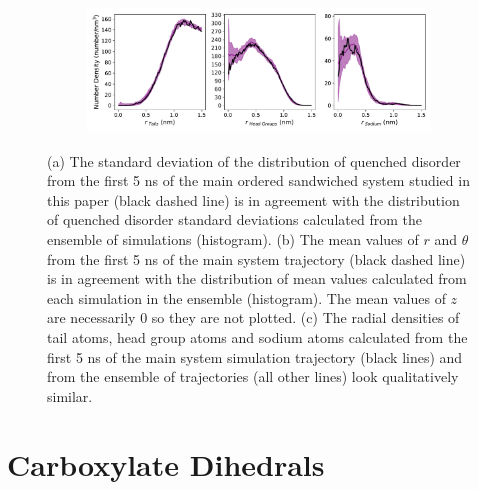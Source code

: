 \documentclass{article}
\begin{document}
\begin{figure}[!htb]
\begin{subfigure}{\textwidth}
  \includegraphics[width=\textwidth]{sandwiched_ensemble_regional_density.pdf}
  \caption{}\label{fig:offset_ensemble_regional_density}
  \end{subfigure}
  \caption{(a) The standard deviation of the distribution of quenched disorder
  from the first 5 ns of the main ordered sandwiched system studied in
  this paper (black dashed line) is in agreement with the distribution of quenched disorder 
  standard deviations calculated from the ensemble of simulations (histogram). 
  (b) The mean values of $r$ and $\theta$ from the first 5 ns of the main
  system trajectory (black dashed line) is in agreement with the distribution of mean values
  calculated from each simulation in the ensemble (histogram). The mean values of $z$
  are necessarily 0 so they are not plotted. (c) The radial densities of tail
  atoms, head group atoms and sodium atoms calculated from the first 5 ns of the
  main system simulation trajectory (black lines) and from the ensemble of 
  trajectories (all other lines) look qualitatively similar.}\label{fig:ensemble_stds}
  \end{figure}
  
  \clearpage

  \section{Carboxylate Dihedrals}
\end{document}
